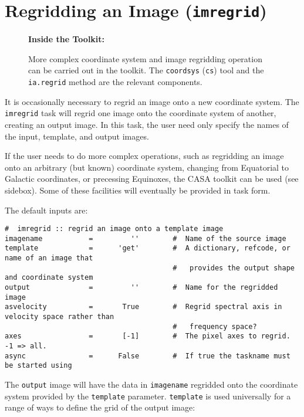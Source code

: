 \section{Regridding an Image ({\tt imregrid})}
\label{section:analysis.regrid}

\begin{wrapfigure}{r}{2.5in}
  \begin{boxedminipage}{2.5in}
     \centerline{\bf Inside the Toolkit:}
     More complex coordinate system and image regridding 
     operation can be carried out in the toolkit.  The 
     {\tt coordsys} ({\tt cs}) tool and the {\tt ia.regrid}
     method are the relevant components.
  \end{boxedminipage}
\end{wrapfigure}

It is occasionally necessary to regrid an image onto a new coordinate
system.  The {\tt imregrid} task will regrid one image onto the
coordinate system of another, creating an output image.  In this
task, the user need only specify the names of the input, template, and
output images.  

If the user needs to do more complex operations, such as regridding an
image onto an arbitrary (but known) coordinate system, changing from
Equatorial to Galactic coordinates, or precessing Equinoxes, the CASA
toolkit can be used (see sidebox).  Some of these facilities will
eventually be provided in task form.

The default inputs are:
\small
\begin{verbatim}
#  imregrid :: regrid an image onto a template image
imagename           =         ''        #  Name of the source image
template            =      'get'        #  A dictionary, refcode, or name of an image that
                                        #   provides the output shape and coordinate system
output              =         ''        #  Name for the regridded image
asvelocity          =       True        #  Regrid spectral axis in velocity space rather than
                                        #   frequency space?
axes                =       [-1]        #  The pixel axes to regrid. -1 => all.
async               =      False        #  If true the taskname must be started using
\end{verbatim}
\normalsize
The {\tt output} image will have the data in {\tt imagename} regridded
onto the coordinate system provided by the {\tt template} parameter.
{\tt template} is used universally for a range of ways to define the
grid of the output image:

